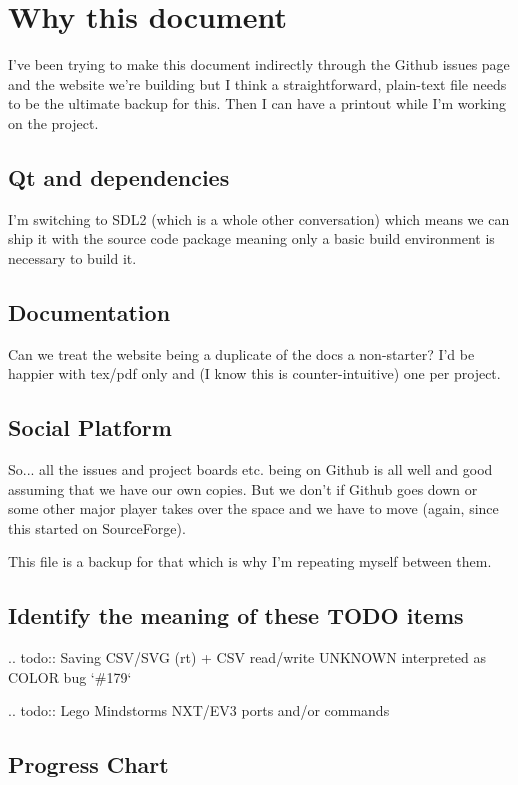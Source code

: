 \documentclass[a4paper]{report}
\begin{document}
\section{Why this document}

I've been trying to make this document indirectly through the Github
issues page and the website we're building but I think a
straightforward, plain-text file needs to be the ultimate backup for
this. Then I can have a printout while I'm working on the project.

\subsection{Qt and dependencies}

I'm switching to SDL2 (which is a whole other conversation) which means
we can ship it with the source code package meaning only a basic build
environment is necessary to build it.

\subsection{Documentation}

Can we treat the website being a duplicate of the docs a non-starter?
I'd be happier with tex/pdf only and (I know this is counter-intuitive)
one per project.

\subsection{Social Platform}

So... all the issues and project boards etc. being on Github is all
well and good assuming that we have our own copies. But we don't if
Github goes down or some other major player takes over the space and we
have to move (again, since this started on SourceForge).

This file is a backup for that which is why I'm repeating myself between
them.

\subsection{Identify the meaning of these TODO items}

.. todo::
   Saving CSV/SVG (rt) + CSV read/write UNKNOWN interpreted as COLOR bug `\#179`

.. todo::
   Lego Mindstorms NXT/EV3 ports and/or commands

\subsection{Progress Chart}
\end{document}
